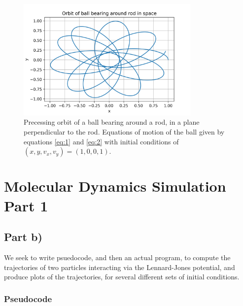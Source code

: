 \documentclass{article}
\begin{document}
\begin{figure}[H]
	\centering
	\includegraphics[width=0.8\textwidth]{../images/q1_orbit.png}
	\caption{Precessing orbit of a ball bearing around a rod, in a plane perpendicular to the rod. Equations of motion of the ball given by equations \ref{eq:1} and \ref{eq:2} with initial conditions of $(x,y,v_x,v_y)=(1,0,0,1)$.}
	\label{fig:q1_orbit}
\end{figure}

\section{Molecular Dynamics Simulation Part 1}

\subsection{Part b)}

We seek to write psuedocode, and then an actual program, to compute the trajectories of two particles interacting via the Lennard-Jones potential, and produce plots of the trajectories, for several different sets of initial conditions.

\subsubsection{Pseudocode}
\end{document}
